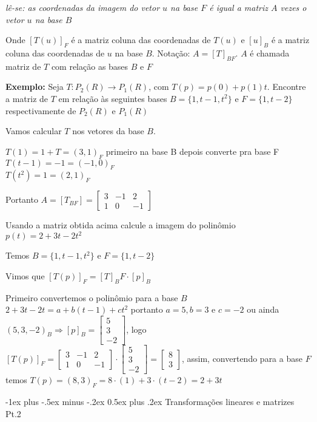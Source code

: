 \documentclass[10pt,landscape]{article}
\makeatletter
\renewcommand{\section}{\@startsection{section}{1}{0mm}%
                                {-1ex plus -.5ex minus -.2ex}%
                                {0.5ex plus .2ex}%
                                {\normalfont\large\bfseries}}
\makeatother
\begin{document}
\begin{multicols}{3}
\textit{lê-se: as coordenadas da imagem do vetor $u$ na base $F$ é igual a matriz $A$ vezes o vetor $u$ na base $B$}

Onde $[T(u)]_F$ é a matriz coluna das coordenadas de $T(u)$ e $[u]_B$ é a matriz coluna das coordenadas de $u$ na base $B$. Notação: $A=[T]_{BF}$. $A$ é chamada matriz de $T$ com relação as bases $B$ e $F$

\textbf{Exemplo:} Seja $T:P_2(R)\rightarrow P_1(R)$, com $T(p)=p(0)+p(1)t$. Encontre a matriz de $T$ em relação às seguintes bases $B=\{1,t-1,t^2\}$ e $F=\{1,t-2\}$ respectivamente de $P_2(R)$ e $P_1(R)$

Vamos calcular $T$ nos vetores da base $B$.

$T(1)=1+T=(3,1)_F$ {\tiny primeiro na base B depois converte pra base F}\\
$T(t-1)=-1=(-1,0)_F$\\
$T(t^2)=1=(2,1)_F$

Portanto $A=[T_{BF}]=\begin{bmatrix}3&-1&2\\1&0&-1\end{bmatrix}$

Usando a matriz obtida acima calcule a imagem do polinômio $p(t)=2+3t-2t^2$

Temos $B=\{1,t-1,t^2\}$ e $F=\{1,t-2\}$

Vimos que $[T(p)]_F=[T]_BF\cdot[p]_B$

Primeiro convertemos o polinômio para a base $B$ $2+3t-2t=a+b(t-1)+ct^2$ portanto $a=5, b=3$ e $c=-2$ ou ainda $(5,3,-2)_B \Rightarrow [p]_B = \begin{bmatrix} 5\\3\\-2 \end{bmatrix}$, logo $[T(p)]_F=\begin{bmatrix}3&-1&2\\1&0&-1 \end{bmatrix}\cdot\begin{bmatrix} 5\\3\\-2 \end{bmatrix} = \begin{bmatrix} 8\\3 \end{bmatrix}$, assim, convertendo para a base $F$ temos $T(p)=(8,3)_F=8\cdot(1)+3\cdot(t-2)=2+3t$

\section{Transformações lineares e matrizes Pt.2}
 

\end{multicols}
\end{document}
